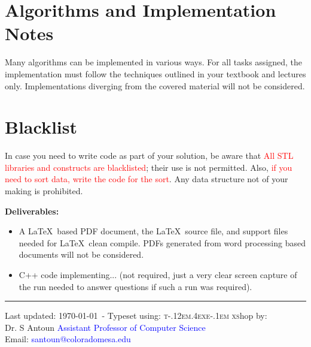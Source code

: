 \documentclass{article}
\begin{document}
\section*{Algorithms and Implementation Notes}
Many algorithms can be implemented in various ways. For all tasks assigned, the implementation must follow the techniques outlined in your textbook and lectures only. Implementations diverging from the covered material will not be considered.

\section*{Blacklist}
In case you need to write code as part of your solution, be aware that \textcolor{red}{All STL libraries and constructs are blacklisted}; their use is not permitted. Also, \textcolor{red}{if you need to sort data, write the code for the sort}. Any data structure not of your making is prohibited.

\textbf{Deliverables:}
\begin{itemize}
  \item A \LaTeX\ based PDF document, the \LaTeX\ source file, and support files needed for \LaTeX\ clean compile.
  \subitem PDFs generated from word processing based documents will not be considered.
  \item C++ code implementing... (not required, just a very clear screen capture of the run needed to answer questions if such a run was required).
\end{itemize}

\vfill
\hrule

\begin{center}
{\scriptsize Last updated: \today\ - Typeset using: \textsc{t\kern -.12em\lower.4ex\hbox{e}\kern-.1em xs}hop by:\\ Dr. S Antoun \textcolor{blue}{Assistant Professor of Computer Science} \\ Email: \textcolor{blue}{santoun@coloradomesa.edu}}
\end{center}
\end{document}
